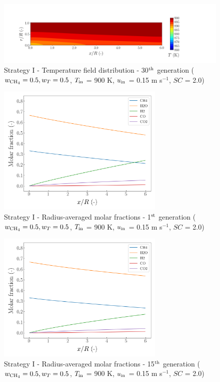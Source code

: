 \documentclass[preprint,12pt]{elsarticle}
\begin{document}
\begin{figure}[h!]
\centering
\includegraphics[width=190mm]{results/5/50C_50T/GEN30-TFIELD.png}
\caption{\label{fig:5R5050G30-TField} Strategy I - Temperature field distribution - 30$^{\rm{th}}$ generation ($w_{\rm{CH_4}} = 0.5, w_T = 0.5$, $T_{\rm{in}}$ = 900 K, $u_{\rm{in}}$ = 0.15 m s$^{-1}$, $SC$ = 2.0)}
\end{figure}


\begin{figure}[h!]
\centering
\includegraphics[width=80mm]{results/5/50C_50T/GEN1-AVG.png}
\caption{\label{fig:5R5050G1-avg} Strategy I - Radius-averaged molar fractions - 1$^{\rm{st}}$ generation ($w_{\rm{CH_4}} = 0.5, w_T = 0.5$, $T_{\rm{in}}$ = 900 K, $u_{\rm{in}}$ = 0.15 m s$^{-1}$, $SC$ = 2.0)}
\end{figure}

\begin{figure}[h!]
\centering
\includegraphics[width=80mm]{results/5/50C_50T/GEN15-AVG.png}
\caption{\label{fig:5R5050G15-avg} Strategy I - Radius-averaged molar fractions - 15$^{\rm{th}}$ generation ($w_{\rm{CH_4}} = 0.5, w_T = 0.5$, $T_{\rm{in}}$ = 900 K, $u_{\rm{in}}$ = 0.15 m s$^{-1}$, $SC$ = 2.0)}
\end{figure}
\end{document}
